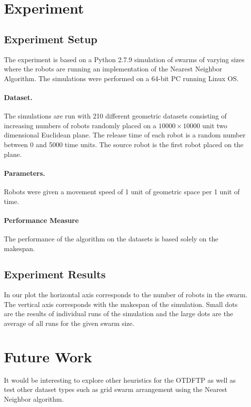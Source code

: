 \documentclass[twoside]{article}
\begin{document}
\begin{multicols}{2}
\section{Experiment}
\subsection{Experiment Setup}
The experiment is based on a Python 2.7.9 simulation of swarms of varying sizes where the robots are running an implementation of the Nearest Neighbor Algorithm. The simulations were performed on a 64-bit PC running Linux OS.
\paragraph{Dataset.} The simulations are run with 210 different geometric datasets consisting of increasing numbers of robots randomly placed on a $10000 \times 10000$ unit two dimensional Euclidean plane. The release time of each robot is a random number between 0 and 5000 time units. The source robot is the first robot placed on the plane.
\paragraph{Parameters.} Robots were given a movement speed of 1 unit of geometric space per 1 unit of time.
\paragraph{Performance Measure} The performance of the algorithm on the datasets is based solely on the makespan. 

\subsection{Experiment Results}
In our plot the horizontal axis corresponds to the number of robots in the swarm. The vertical axis corresponds with the makespan of the simulation. Small dots are the results of individual runs of the simulation and the large dots are the average of all runs for the given swarm size.

\section{Future Work}
It would be interesting to explore other heuristics for the OTDFTP as well as test other dataset types such as grid swarm arrangement using the Nearest Neighbor algorithm.

{}



\end{multicols}
\end{document}
